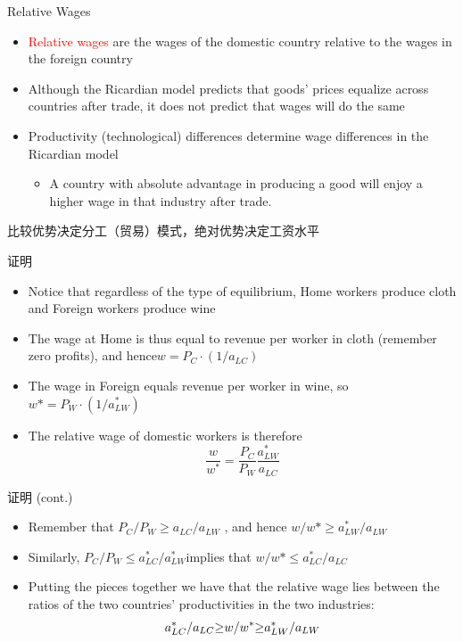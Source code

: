 \documentclass[10pt,hyperref={CJKbookmarks=true},xcolor=dvipsnames,aspectratio=169]{beamer}
\begin{document}
\begin{frame}{Relative Wages}

\begin{itemize}
\item \textcolor{red}{Relative wages} are the wages of the domestic country
relative to the wages in the foreign country 
\item Although the Ricardian model predicts that goods’ prices equalize
across countries after trade, it does not predict that wages will
do the same 
\item Productivity (technological) differences determine wage differences
in the Ricardian model 

\begin{itemize}
\item A country with absolute advantage in producing a good will enjoy a
higher wage in that industry after trade.
\end{itemize}
\end{itemize}
 \begin{theorem}
 	比较优势决定分工（贸易）模式，绝对优势决定工资水平
 \end{theorem}
\end{frame}

\begin{frame}{证明}

\begin{itemize}
\item Notice that regardless of the type of equilibrium, Home workers produce
cloth and Foreign workers produce wine 
\item The wage at Home is thus equal to revenue per worker in cloth (remember
zero profits), and hence$w=P_{C}\cdot(1/a_{LC})$
\item The wage in Foreign equals revenue per worker in wine, so $w*=P_{W}\cdot(1/a_{LW}^{*})$
\item The relative wage of domestic workers is therefore 
\[
\frac{w}{w^{*}}=\frac{P_{C}}{P_{W}}\frac{a{}_{LW}^{*}}{a_{LC}}
\]

\end{itemize}
\end{frame}

\begin{frame}{证明 (cont.)}

\begin{itemize}
\item Remember that $P_{C}/P_{W}\ge a_{LC}/a_{LW}$ , and hence $w/w*\ge a_{LW}^{*}/a_{LW}$ 
\item Similarly, $P_{C}/P_{W}\le a_{LC}^{*}/a_{LW}^{*}$implies that $w/w*\le a_{LC}^{*}/a_{LC}$ 
\item Putting the pieces together we have that the relative wage lies between
the ratios of the two countries’ productivities in the two industries:
\[
a_{LC}^{*}/a_{LC}\text{\ensuremath{\ge}}w/w^{*}\text{\ensuremath{\ge}}a_{LW}^{*}/a_{LW}
\]

\end{itemize}
\end{frame}
\end{document}
